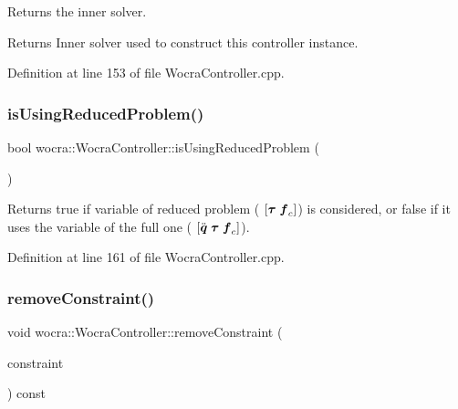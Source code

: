 Returns the inner solver.

\begin{DoxyReturn}{Returns}
Inner solver used to construct this controller instance. 
\end{DoxyReturn}


Definition at line 153 of file Wocra\+Controller.\+cpp.

\hypertarget{classwocra_1_1WocraController_a89eab1194e0598d8b30730429f286450}{}\label{classwocra_1_1WocraController_a89eab1194e0598d8b30730429f286450} 
\subsubsection{\texorpdfstring{is\+Using\+Reduced\+Problem()}{isUsingReducedProblem()}}
{\footnotesize\ttfamily bool wocra\+::\+Wocra\+Controller\+::is\+Using\+Reduced\+Problem (\begin{DoxyParamCaption}{ }\end{DoxyParamCaption})}

\begin{DoxyReturn}{Returns}
{\ttfamily true} if variable of reduced problem ( $ [ \mbox{\boldmath${\tau}$} \; \mbox{\boldmath${f}$}_c ] $) is considered, or {\ttfamily false} if it uses the variable of the full one ( $ [ \ddot{\mbox{\boldmath${q}$}} \; \mbox{\boldmath${\tau}$} \; \mbox{\boldmath${f}$}_c ] $). 
\end{DoxyReturn}


Definition at line 161 of file Wocra\+Controller.\+cpp.

\hypertarget{classwocra_1_1WocraController_ac1234e8084fedc0ed39e2ee97a40a31c}{}\label{classwocra_1_1WocraController_ac1234e8084fedc0ed39e2ee97a40a31c} 
\subsubsection{\texorpdfstring{remove\+Constraint()}{removeConstraint()}\hspace{0.1cm}{\footnotesize\ttfamily [1/2]}}
{\footnotesize\ttfamily void wocra\+::\+Wocra\+Controller\+::remove\+Constraint (\begin{DoxyParamCaption}\item[{\hyperlink{namespaceocra_ae8b87cf4099be3efc3b410019ad2046e}{ocra\+::\+Linear\+Constraint} \&}]{constraint }\end{DoxyParamCaption}) const}

